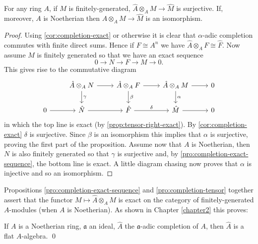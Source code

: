 \begin{proposition}\label{pro:completion-tensor}
    For any ring $A$, if $M$ is finitely-generated, $\widehat{A} \otimes_A M \to \widehat{M}$ is surjective. If, moreover, $A$ is Noetherian then $\widehat{A} \otimes_A M \to \widehat{M}$ is an isomorphism.
\end{proposition}
\begin{proof}
    Using \eqref{cor:completion-exact} or otherwise it is clear that $\alpha$-adic completion commutes with finite direct sums. Hence if $F \cong A^n$ we have $\widehat{A} \otimes_A F \cong \widehat{F}$. Now assume $M$ is finitely generated so that we have an exact sequence
    \[
    0 \longrightarrow N \longrightarrow F \longrightarrow M \longrightarrow 0.
    \]
    This gives rise to the commutative diagram
    \[\begin{tikzcd}
        & {\hat A\otimes_AN} & {\hat A\otimes_AF} & {\hat A\otimes_AM} & 0 \\
        0 & {\hat N} & {\hat F} & {\hat M} & 0
        \arrow[from=1-2, to=1-3]
        \arrow["\gamma", from=1-2, to=2-2]
        \arrow[from=1-3, to=1-4]
        \arrow["\beta", from=1-3, to=2-3]
        \arrow[from=1-4, to=1-5]
        \arrow["\alpha", from=1-4, to=2-4]
        \arrow[from=2-1, to=2-2]
        \arrow[from=2-2, to=2-3]
        \arrow["\delta", from=2-3, to=2-4]
        \arrow[from=2-4, to=2-5]
    \end{tikzcd}\]
    in which the top line is exact (by \eqref{prop:tensor-right-exact}). By \eqref{cor:completion-exact} $\delta$ is surjective. Since $\beta$ is an isomorphism this implies that $\alpha$ is surjective, proving the first part of the proposition. Assume now that $A$ is Noetherian, then $N$ is also finitely generated so that $\gamma$ is surjective and, by \eqref{pro:completion-exact-sequence}, the bottom line is exact. A little diagram chasing now proves that $\alpha$ is injective and so an isomorphism. 
\end{proof}

Propositions \eqref{pro:completion-exact-sequence} and \eqref{pro:completion-tensor} together assert that the functor $M \mapsto \widehat{A} \otimes_A M$ is exact on the category of finitely-generated $A$-modules (when $A$ is Noetherian). As shown in Chapter \ref{chapter2} this proves:

\begin{proposition}\label{prop:10.14}
If $A$ is a Noetherian ring, $\mathfrak{a}$ an ideal, $\widehat{A}$ the $\mathfrak{a}$-adic completion of $A$, then $\widehat{A}$ is a flat $A$-algebra. \qed
\end{proposition}

